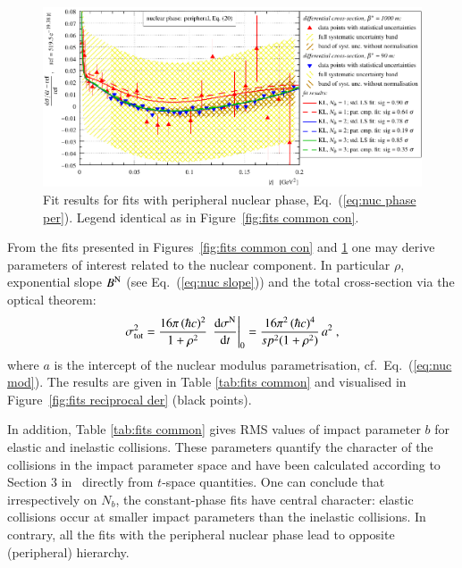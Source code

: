 \begin{figure}
\begin{center}
\includegraphics{fig/fits_common_per.pdf}
\caption{%
Fit results for fits with peripheral nuclear phase, Eq.~(\ref{eq:nuc phase per}). Legend identical as in Figure~\ref{fig:fits common con}.
}
\label{fig:fits common per}
\end{center}
\end{figure}


From the fits presented in Figures~\ref{fig:fits common con} and \ref{fig:fits common per} one may derive parameters of interest related to the nuclear component. In particular $\rho$, exponential slope $B^{\rm N}$ (see Eq.~(\ref{eq:nuc slope})) and the total cross-section via the optical theorem:
\begin{equation}
\label{eq:si tot}
\sigma_{\rm tot}^2 = {16\pi\, (\hbar c)^2\over 1 + \rho^2}\, \left. \d\sigma^{\rm N}\over\d t\right|_0
		= {16\pi^2\, (\hbar c)^4\over s p^2 (1+\rho^2)}\, a^2\ ,
\end{equation}
where $a$ is the intercept of the nuclear modulus parametrisation, cf.~Eq.~(\ref{eq:nuc mod}). The results are given in Table \ref{tab:fits common} and visualised in Figure~\ref{fig:fits reciprocal der} (black points).

In addition, Table \ref{tab:fits common} gives RMS values of impact parameter $b$ for elastic and inelastic collisions. These parameters quantify the character of the collisions in the impact parameter space and have been calculated according to Section 3 in~\cite{klk02} directly from $t$-space quantities. 
One can conclude that irrespectively on $N_b$, the constant-phase fits have central character: elastic collisions occur at smaller impact parameters than the inelastic collisions. In contrary, all the fits with the peripheral nuclear phase lead to opposite (peripheral) hierarchy.


